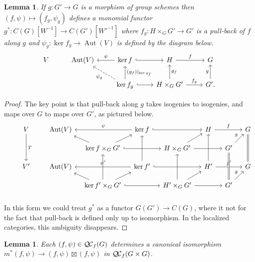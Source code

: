 \documentclass[11pt]{amsart}
\theoremstyle{plain}
\newtheorem{lemma}[theorem]{Lemma}
\theoremstyle{definition}
\theoremstyle{remark}
\DeclareMathOperator{\Aut}{Aut}
\newcommand{\QC}{{\mathcal{Q\hskip-0.8pt C}}}
\newcommand{\QCf}{{\QC_f}}
\begin{document}
\begin{lemma}\label{lemma:finite-pull-back}
If $g : G'\to G$ is a morphism of group schemes then $(f,\psi) \mapsto (f_g,\psi_g)$ defines a monomial functor $g^* : C(G)[W^{-1}] \to C(G')[W'^{-1}]$ where $f_g : H\times_G G'\to G'$ is a pull-back of $f$ along $g$ and $\psi_g : \ker f_g \to \Aut(V)$ is defined by the diagram below.
\[
\begin{tikzcd}
V & \Aut(V) & \arrow[swap]{l}{\psi} \ker f \arrow[hook]{r} & H \arrow{r}{f} &  G\\
  &  & \arrow[dashed]{ul}{\psi_g} \arrow[swap]{u}{(g_f)\vert_{\ker g_f}} \ker f_g \arrow[hook]{r} & \arrow[swap]{u}{g_f} H\times_G G' \arrow{r}{f_g} & \arrow{u}{g} G'.
\end{tikzcd}
\]
\end{lemma}

\begin{proof}
The key point is that pull-back along $g$ takes isogenies to isogenies, and maps over $G$ to maps over $G'$, as pictured below.
\[
\begin{tikzcd}[row sep=10,column sep=10]
\ & V \arrow{dd}{T} && \Aut(V) && \arrow[swap]{ll}{\psi} \ker f \arrow[hook]{rr} && H \arrow{rr}{f} && \arrow[equal]{dd} G\\
 && && \arrow{ul} \ker f\times_G G' \arrow{ur} \arrow[hook]{rr} && H\times_G G' \arrow{ur} \arrow{rr} && G' \arrow{ur}{g} & \\
& V' && \Aut(V) && \arrow[swap]{ll}{\psi'} \arrow[swap]{uu}{} \ker f'  \arrow[hook]{rr} && \arrow[swap]{uu} H' \arrow{rr}{f'} && G\\
 && && \arrow{ul} \ker f'\times_G G' \arrow{uu} \arrow{ur} \arrow[hook]{rr} && \arrow{uu} H'\times_G G' \arrow{ur} \arrow{rr} && \arrow[equals]{uu} G' \arrow{ur}{g} & \\
\end{tikzcd}
\]
In this form we could treat $g^*$ as a functor $G(G')\to C(G)$, where it not for the fact that pull-back is defined only up to isomorphism. In the localized categories, this ambiguity disappears. 
\end{proof}


\begin{lemma}\label{lemma:finite-iso}
Each $(f,\psi)\in \QCf(G)$ determines a canonical isomorphism $m^*(f,\psi) \to (f,\psi)\boxtimes(f,\psi)$ in $\QCf(G\times G)$.
 \end{lemma}
\end{document}
